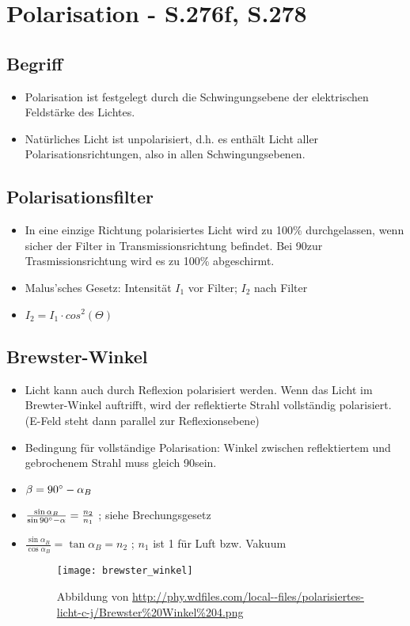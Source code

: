 \section{Polarisation - S.276f, S.278}

\subsection{Begriff}
\begin{itemize}
\item Polarisation ist festgelegt durch die Schwingungsebene der elektrischen Feldstärke des Lichtes.
\item Natürliches Licht ist unpolarisiert, d.h. es enthält Licht aller Polarisationsrichtungen, also in allen Schwingungsebenen.
\end{itemize}

\subsection{Polarisationsfilter}
\begin{itemize}
\item In eine einzige Richtung polarisiertes Licht wird zu 100\% durchgelassen, wenn sicher der Filter in Transmissionsrichtung befindet. Bei 90\degree zur Trasmissionsrichtung wird es zu 100\% abgeschirmt.
\item Malus'sches Gesetz: Intensität $I_1$ vor Filter; $I_2$ nach Filter
\item $I_2 = I_1 \cdot cos^2(\Theta)$
\end{itemize}

\subsection{Brewster-Winkel}
\begin{itemize}
\item Licht kann auch durch Reflexion polarisiert werden. Wenn das Licht im Brewter-Winkel auftrifft, wird der reflektierte Strahl vollständig polarisiert.
(E-Feld steht dann parallel zur Reflexionsebene)
\item Bedingung für vollständige Polarisation: Winkel zwischen reflektiertem und gebrochenem Strahl muss gleich 90\degree sein.
\item $\beta = 90\degree - \alpha_B$
\item $\frac{\sin{\alpha_B}}{\sin{90\degree - \alpha}} = \frac{n_2}{n_1}$ \tabto{4cm}; siehe Brechungsgesetz
\item $\frac{\sin{\alpha_B}}{\cos{\alpha_B}} = \tan{\alpha_B} = n_2$ \tabto{4cm}; $n_1$ ist 1 für Luft bzw. Vakuum

\begin{figure}[h!]
\centering \texttt{[image: brewster\_winkel]}
\caption{Abbildung von \url{http://phy.wdfiles.com/local--files/polarisiertes-licht-c-j/Brewster\%20Winkel\%204.png}}
\end{figure}

\end{itemize}




